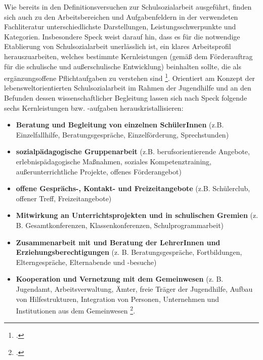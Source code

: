 Wie bereits in den Definitionsversuchen zur Schulsozialarbeit ausgeführt, finden sich auch zu den Arbeitsbereichen und Aufgabenfeldern in der verwendeten Fachliteratur unterschiedlichste Darstellungen, Leistungsschwerpunkte und Kategorien. Insbesondere Speck weist darauf hin, dass es für die notwendige Etablierung von Schulsozialarbeit unerlässlich ist, ein klares Arbeitsprofil herauszuarbeiten, welches bestimmte Kernleistungen (gemäß dem Förderauftrag für die schulische und außerschulische Entwicklung) beinhalten sollte, die als ergänzungsoffene Pflichtaufgaben zu verstehen sind \footcite[vgl.][62]{Speck2007}. Orientiert am Konzept der lebensweltorientierten Schulsozialarbeit im Rahmen der Jugendhilfe und an den Befunden dessen wissenschaftlicher Begleitung lassen sich nach Speck folgende sechs Kernleistungen bzw. -aufgaben herauskristallisieren: 
\begin{itemize}
	\item \textbf{Beratung und Begleitung von einzelnen SchülerInnen} (z.B. Einzelfallhilfe, Beratungsgespräche, Einzelförderung, Sprechstunden)
	\item \textbf{sozialpädagogische Gruppenarbeit} (z.B. berufsorientierende Angebote, erlebnispädagogische Maßnahmen, soziales Kompetenztraining, außerunterrichtliche Projekte, offenes Förderangebot)
	\item \textbf{offene Gesprächs-, Kontakt- und Freizeitangebote} (z.B. Schülerclub, offener Treff, Freizeitangebote)
	\item \textbf{Mitwirkung an Unterrichtsprojekten und in schulischen Gremien} (z. B. Gesamtkonferenzen, Klassenkonferenzen, Schulprogrammarbeit)
	\item \textbf{Zusammenarbeit mit und Beratung der LehrerInnen und Erziehungsberechtigungen} (z. B. Beratungsgespräche, Fortbildungen, Elterngespräche, Elternabende und -besuche)
	\item \textbf{Kooperation und Vernetzung mit dem Gemeinwesen} (z. B. Jugendamt, Arbeitsverwaltung, Ämter, freie Träger der Jugendhilfe, Aufbau von Hilfestrukturen, Integration von Personen, Unternehmen und Institutionen aus dem Gemeinwesen \footcite[vgl.][63f]{Speck2007}.
\end{itemize}


